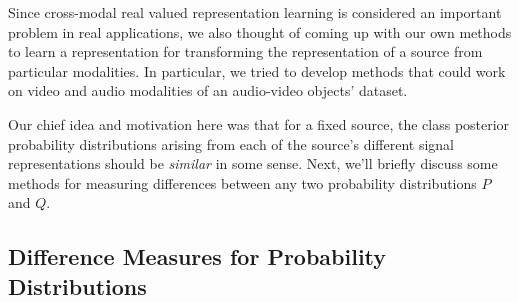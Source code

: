 \documentclass{article}
\begin{document}
Since cross-modal real valued representation learning is considered an important problem in real applications, we also thought of coming up with our own methods to learn a representation for transforming the representation of a source from particular modalities. In particular, we tried to develop methods that could work on video and audio modalities of an audio-video objects' dataset. 

Our chief idea and motivation here was that for a fixed source, the class posterior probability distributions arising from each of the source's different signal representations should be \textit{similar} in some sense. Next, we'll briefly discuss some methods for measuring differences between any two probability distributions $P$ and $Q$.

\subsection{Difference Measures for Probability Distributions}
\end{document}
